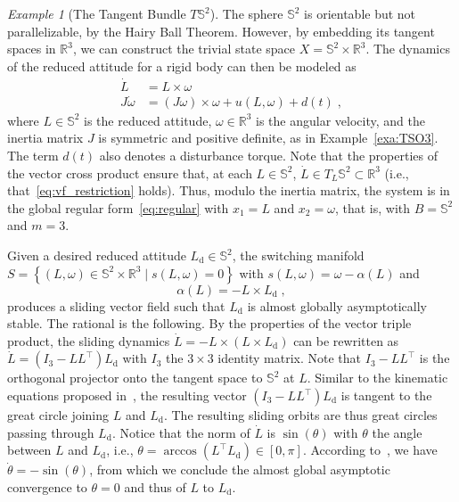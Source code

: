 \documentclass{article}
\theoremstyle{definition}
\theoremstyle{remark}
\newtheorem{example}{Example}
\newcommand{\MA}{X}	%
\newcommand{\RR}{\mathbb{R}}	%
\newcommand{\rd}{\mathrm{d}}	%
\newcommand{\SP}{\mathbb{S}}	%
\begin{document}
\begin{example}[The Tangent Bundle $T\SP^2$] \label{exa:TSP2}
 The sphere $\SP^2$ is orientable but not parallelizable, by the Hairy Ball Theorem. However, by embedding its tangent
 spaces in $\RR^3$, we can construct the trivial state space $\MA = \SP^2\times\RR^3$. The dynamics of the reduced attitude 
 for a rigid body can then be modeled as~\cite{chaturvedi2011}
 \begin{subequations} \label{eq:vf_SP2}
 \begin{align}
        \dot{L} &= L \times \omega \label{eq:vf_SP2_1} \\
  J\dot{\omega} &= (J\omega) \times \omega + u(L,\omega) + d(t)  \;,
 \end{align}
 \end{subequations}
 where $L \in \SP^2$ is the reduced attitude, $\omega \in \RR^3$ is the angular velocity, and the inertia matrix $J$ is symmetric and
 positive definite, as in Example~\ref{exa:TSO3}. The term $d(t)$ also denotes a disturbance torque. Note that the properties of the vector cross product 
 ensure that, at each $L \in \SP^2$, $\dot{L} \in T_L\SP^2 \subset \RR^3$ (i.e., that~\eqref{eq:vf_restriction} holds). Thus, modulo
 the inertia matrix, the system is in the global regular form~\eqref{eq:regular} with $x_1 = L$ and $x_2 = \omega$, that is,
 with $B = \SP^2$ and $m=3$.

 Given a desired reduced attitude $L_\rd \in \SP^2$, the switching manifold
 $S = \left\{ (L,\omega) \in \SP^2\times\RR^3 \mid s(L,\omega) = 0 \right\}$ with $s(L,\omega) = \omega - \alpha(L)$ and
 \begin{equation} \label{eq:s_SP2}
  \alpha(L) = -L\times L_\rd \;,
 \end{equation}
 produces a sliding vector field such that $L_\rd$ is almost globally asymptotically stable. The rational is the following.
 By the properties of the vector triple product, the sliding dynamics $\dot{L} = -L\times(L\times L_\rd)$ can be rewritten 
 as $\dot{L} = (I_3 - LL^\top)L_\rd$  with $I_3$ the $3\times 3$ identity matrix. Note that $I_3 - LL^\top$ is the orthogonal
 projector onto the tangent space to $\SP^2$ at $L$. Similar to the kinematic equations proposed in~\cite{bullo1995}, the resulting
 vector $(I_3 - LL^\top)L_\rd$ is tangent to the great circle joining $L$ and $L_\rd$. The resulting sliding orbits are thus
 great circles passing through $L_\rd$. Notice that the norm of $\dot{L}$ is $\sin(\theta)$ with $\theta$ the angle
 between $L$ and $L_\rd$, i.e., $\theta = \arccos (L^\top L_\rd) \in [0,\pi]$. According to~\cite[Lem. 1]{bullo1995}, we have
 $\dot{\theta} = -\sin(\theta)$, from which we conclude the almost global asymptotic convergence to $\theta=0$ and thus of
 $L$ to $L_\rd$.


\end{example}
\end{document}
